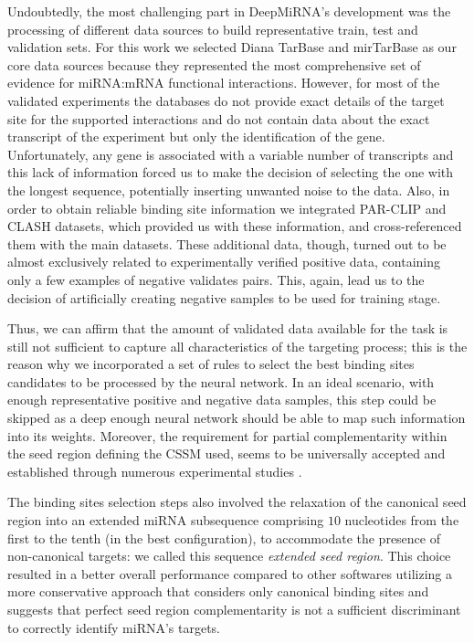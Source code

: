 Undoubtedly, the most challenging part in DeepMiRNA's development was the processing of different data sources to build representative train, test and validation sets. For this work we selected Diana TarBase and mirTarBase as our core data sources because they represented the most comprehensive set of evidence for miRNA:mRNA functional interactions. However, for most of the validated experiments the databases do not provide exact details of the target site for the supported interactions and do not contain data about the exact transcript of the experiment but only the identification of the gene. Unfortunately, any gene is associated with a variable number of transcripts and this lack of information forced us to make the decision of selecting the one with the longest sequence, potentially inserting unwanted noise to the data.    Also, in order to  obtain reliable binding site information we integrated PAR-CLIP \cite{grosswendt} and CLASH \cite{helwak} datasets, which provided us with these information, and cross-referenced them with the main datasets. These additional data, though, turned out to be almost exclusively related to experimentally verified positive data, containing only a few examples of negative validates pairs. This, again, lead us to the decision of artificially creating negative samples to be used for training stage.  

Thus, we can affirm that the amount of validated data available for the task is still not sufficient to capture all characteristics of the targeting process; this is the reason why we incorporated a set of rules to select the best binding sites candidates to be processed by the neural network. In an ideal scenario, with enough representative positive and negative data samples, this step could be skipped as a deep enough neural network should be able to map such information into its weights. Moreover, the requirement for partial complementarity within the seed region defining the CSSM used, seems to be universally accepted and established through numerous experimental studies \cite{common_features}.

The binding sites selection steps also involved the relaxation of the canonical seed region into an extended miRNA subsequence comprising $10$ nucleotides from the first to the tenth (in the best configuration), to accommodate the presence of non-canonical targets: we called this sequence \emph{extended seed region}. This choice resulted in a better overall performance compared to other softwares utilizing a more conservative approach that considers only canonical binding sites and suggests that perfect seed region complementarity is not a sufficient discriminant to correctly identify miRNA's targets.

